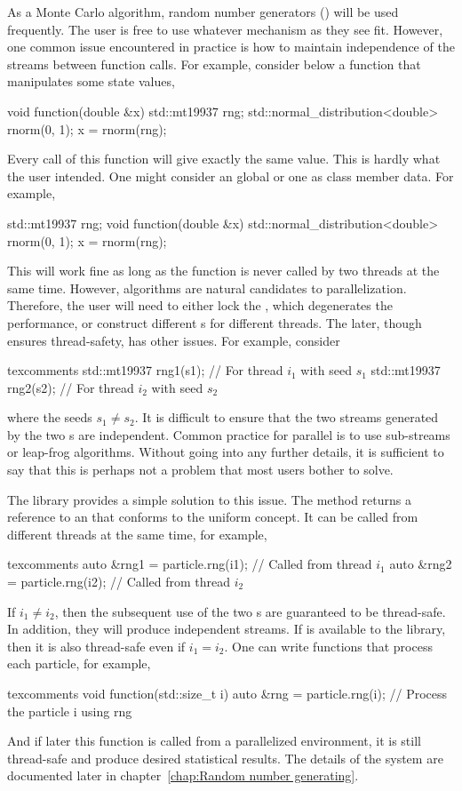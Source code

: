 As a Monte Carlo algorithm, random number generators (\rng) will be used
frequently. The user is free to use whatever \rng mechanism as they see fit.
However, one common issue encountered in practice is how to maintain
independence of the \rng streams between function calls. For example, consider
below a function that manipulates some state values,
\begin{cppcode}
  void function(double &x)
  {
      std::mt19937 rng;
      std::normal_distribution<double> rnorm(0, 1);
      x = rnorm(rng);
  }
\end{cppcode}
Every call of this function will give  exactly the same value.
This is hardly what the user intended. One might consider an global \rng or one
as class member data. For example,
\begin{cppcode}
  std::mt19937 rng;
  void function(double &x)
  {
      std::normal_distribution<double> rnorm(0, 1);
      x = rnorm(rng);
  }
\end{cppcode}
This will work fine as long as the function is never called by two threads at
the same time. However, \smc algorithms are natural candidates to
parallelization. Therefore, the user will need to either lock the \rng, which
degenerates the performance, or construct different \rng{}s for different
threads. The later, though ensures thread-safety, has other issues. For
example, consider
\begin{cppcode*}{texcomments}
  std::mt19937 rng1(s1); // For thread $i_1$ with seed $s_1$
  std::mt19937 rng2(s2); // For thread $i_2$ with seed $s_2$
\end{cppcode*}
where the seeds $s_1 \ne s_2$. It is difficult to ensure that the two streams
generated by the two \rng{}s are independent. Common practice for parallel \rng
is to use sub-streams or leap-frog algorithms. Without going into any further
details, it is sufficient to say that this is perhaps not a problem that most
users bother to solve.

The library provides a simple solution to this issue. The method
 returns a reference to an \rng that conforms to the
\cppoo uniform \rng concept. It can be called from different threads at the
same time, for example,
\begin{cppcode*}{texcomments}
  auto &rng1 = particle.rng(i1); // Called from thread $i_1$
  auto &rng2 = particle.rng(i2); // Called from thread $i_2$
\end{cppcode*}
If $i_1 \ne i_2$, then the subsequent use of the two \rng{}s are guaranteed to
be thread-safe. In addition, they will produce independent streams. If \tbb is
available to the library, then it is also thread-safe even if $i_1 = i_2$. One
can write functions that process each particle, for example,
\begin{cppcode*}{texcomments}
  void function(std::size_t i)
  {
      auto &rng = particle.rng(i);
      // Process the particle i using rng
  }
\end{cppcode*}
And if later this function is called from a parallelized environment, it is
still thread-safe and produce desired statistical results. The details of the
\rng system are documented later in chapter~\ref{chap:Random number generating}.

